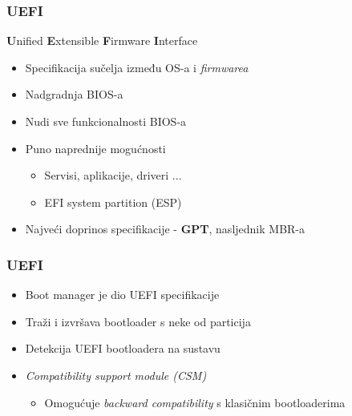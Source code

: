 \documentclass[t]{beamer}
\begin{document}
\begin{frame}
	\frametitle{UEFI}
	\textbf{U}nified \textbf{E}xtensible \textbf{F}irmware \textbf{I}nterface
	\begin{itemize}
		\item Specifikacija sučelja između OS-a i \textit{firmwarea}
		\item Nadgradnja BIOS-a
		\item Nudi sve funkcionalnosti BIOS-a
		\item Puno naprednije mogućnosti
		\begin{itemize}
			\item Servisi, aplikacije, driveri ...
			\item EFI system partition (ESP)
		\end{itemize}
		\item Najveći doprinos specifikacije - \textbf{GPT}, nasljednik MBR-a
	\end{itemize}
\end{frame}

\begin{frame}
	\frametitle{UEFI}
	\begin{itemize}
		\item Boot manager je dio UEFI specifikacije
		\item Traži i izvršava bootloader s neke od particija
		\item Detekcija UEFI bootloadera na sustavu
	\end{itemize}
	\begin{itemize}
		\item \textit{Compatibility support module (CSM)}
		\begin{itemize}
			\item Omogućuje \textit{backward compatibility} s klasičnim bootloaderima
		\end{itemize}
	\end{itemize}
\end{frame}
\end{document}
